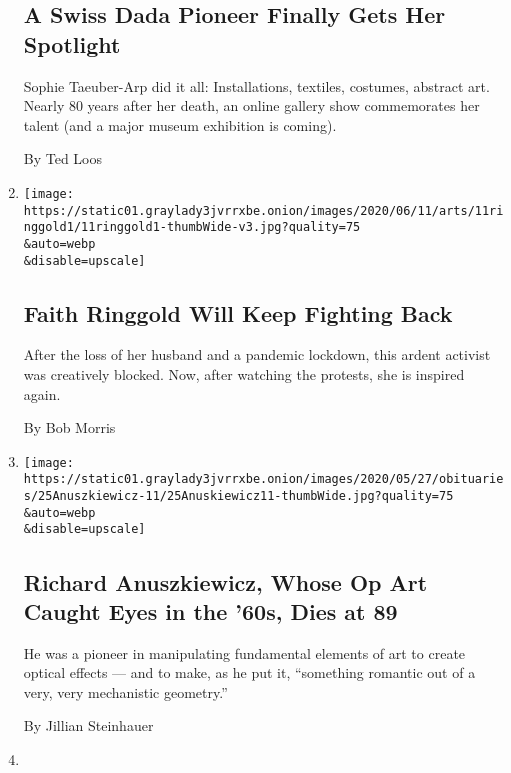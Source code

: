 \begin{enumerate}
{  \subsection{A Swiss Dada Pioneer Finally Gets Her
  Spotlight}\label{a-swiss-dada-pioneer-finally-gets-her-spotlight}}

  Sophie Taeuber-Arp did it all: Installations, textiles, costumes,
  abstract art. Nearly 80 years after her death, an online gallery show
  commemorates her talent (and a major museum exhibition is coming).

  By Ted Loos
\item
  \href{/2020/06/11/arts/design/faith-ringgold-art.html}{}

  \texttt{[image: https://static01.graylady3jvrrxbe.onion/images/2020/06/11/arts/11ringgold1/11ringgold1-thumbWide-v3.jpg?quality=75\\\&auto=webp\\\&disable=upscale]}

  \hypertarget{faith-ringgold-will-keep-fighting-back}{%
  \subsection{Faith Ringgold Will Keep Fighting
  Back}\label{faith-ringgold-will-keep-fighting-back}}

  After the loss of her husband and a pandemic lockdown, this ardent
  activist was creatively blocked. Now, after watching the protests, she
  is inspired again.

  By Bob Morris
\item
  \href{/2020/05/25/arts/richard-anuszkiewicz-dead.html}{}

  \texttt{[image: https://static01.graylady3jvrrxbe.onion/images/2020/05/27/obituaries/25Anuszkiewicz-11/25Anuskiewicz11-thumbWide.jpg?quality=75\\\&auto=webp\\\&disable=upscale]}

  \hypertarget{richard-anuszkiewicz-whose-op-art-caught-eyes-in-the-60s-dies-at-89}{%
  \subsection{Richard Anuszkiewicz, Whose Op Art Caught Eyes in the
  '60s, Dies at
  89}\label{richard-anuszkiewicz-whose-op-art-caught-eyes-in-the-60s-dies-at-89}}

  He was a pioneer in manipulating fundamental elements of art to create
  optical effects --- and to make, as he put it, ``something romantic
  out of a very, very mechanistic geometry.''

  By Jillian Steinhauer
\item
  \href{/2020/04/15/arts/design/rockefeller-center-virtual-tour-virus.html}{}


\end{enumerate}
